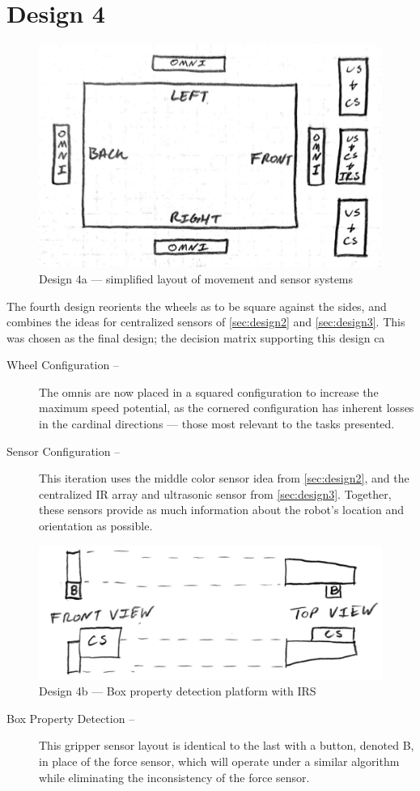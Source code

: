 \documentclass[11pt]{report}
\begin{document}
\newpage
\section{Design 4}\label{sec:design4}
\begin{figure}[H]
    \centering
    \includegraphics[width=0.5\linewidth]{Images//Designs/Design4a.pdf}
    \caption{Design 4a --- simplified layout of movement and sensor systems}
    \label{fig:design4a}
\end{figure}
The fourth design reorients the wheels as to be square against the sides, and combines the ideas for centralized sensors of \cref{sec:design2} and \cref{sec:design3}. This was chosen as the final design; the decision matrix supporting this design ca
\begin{description}
    \item[Wheel Configuration --]The \glspl{omni} are now placed in a squared configuration to increase the maximum speed potential, as the cornered configuration has inherent losses in the cardinal directions --- those most relevant to the tasks presented.
    \item[Sensor Configuration --]This iteration uses the middle color sensor idea from \cref{sec:design2}, and the centralized \gls{IR} array and ultrasonic sensor from \cref{sec:design3}. Together, these sensors provide as much information about the robot's location and orientation as possible.
\end{description}
\begin{figure}[H]
    \centering
    \includegraphics[width=0.5\linewidth]{Images//Designs/Design4b.pdf}
    \caption{Design 4b --- Box property detection platform with IRS}
    \label{fig:design4b}
\end{figure}
\begin{description}
    \item[Box Property Detection --]This gripper sensor layout is identical to the last with a button, denoted \gls{B}, in place of the force sensor, which will operate under a similar algorithm while eliminating the inconsistency of the force sensor.
\end{description}
\end{document}
